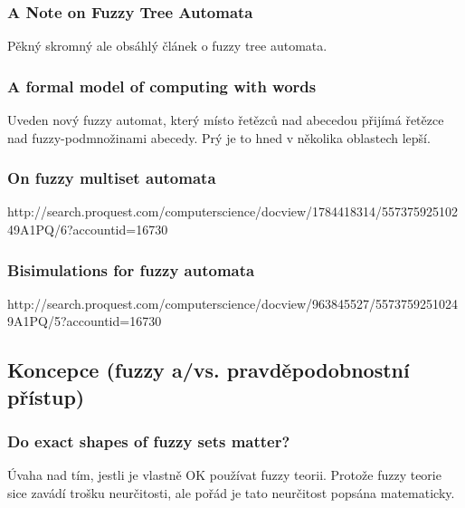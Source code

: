 \documentclass[a4paper,10pt]{article}
\begin{document}
\subsubsection*{A Note on Fuzzy Tree Automata \cite{ChaJos-NoteFuzzTreeAut}}
Pěkný skromný ale obsáhlý článek o fuzzy tree automata.

\subsubsection*{A formal model of computing with words \cite{Yin-FormModCompWords}}
Uveden nový fuzzy automat, který místo řetězců nad abecedou přijímá řetězce nad fuzzy-podmnožinami abecedy. Prý je to hned v několika oblastech lepší.

\subsubsection*{On fuzzy multiset automata}
http://search.proquest.com/computerscience/docview/1784418314/55737592510249A1PQ/6?accountid=16730

\subsubsection*{Bisimulations for fuzzy automata}
http://search.proquest.com/computerscience/docview/963845527/55737592510249A1PQ/5?accountid=16730


\subsection{Koncepce (fuzzy a/vs. pravděpodobnostní přístup)}

\subsubsection*{Do exact shapes of fuzzy sets matter? \cite{Bel-DoExaShaFuzzSetMatt}}
Úvaha nad tím, jestli je vlastně OK používat fuzzy teorii. Protože fuzzy teorie sice zavádí trošku neurčitosti, ale pořád je tato neurčitost popsána matematicky.



\end{document}
